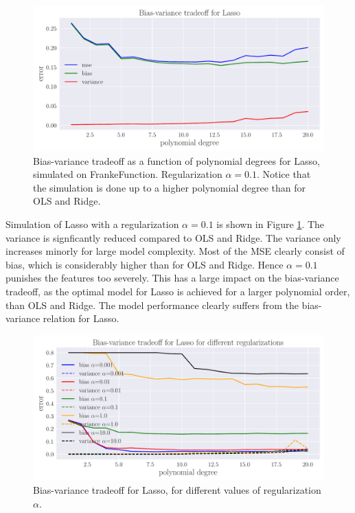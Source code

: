 \documentclass[a4paper]{article}
\begin{document}
	\begin{figure}[h]
		\centering
		\includegraphics[scale=0.5]{../output_extra/plots/bias_var_Lasso_c20.pdf}
		\caption{Bias-variance tradeoff as a function of polynomial degrees for Lasso, simulated on FrankeFunction. Regularization $\alpha=0.1$. Notice that the simulation is done up to a higher polynomial degree than for OLS and Ridge.}
		\label{fig:Lasso}
	\end{figure}
	
	Simulation of Lasso with a regularization $\alpha=0.1$ is shown in Figure \ref{fig:Lasso}. The variance is signficantly reduced compared to OLS and Ridge. The variance only increases minorly for large model complexity. Most of the MSE clearly consist of bias, which is considerably higher than for OLS and Ridge. Hence $\alpha=0.1$ punishes the features too severely. This has a large impact on the bias-variance tradeoff, as the optimal model for Lasso is achieved for a larger polynomial order, than OLS and Ridge. The model performance clearly suffers from the bias-variance relation for Lasso. 
	
	\begin{figure}[h]
		\centering
		\includegraphics[scale=0.5]{../output_extra/plots/bias_var_Lasso_c20_alpha.pdf}
		\caption{Bias-variance tradeoff for Lasso, for different values of regularization $\alpha$.}
		\label{fig:Lasso_alpha}
	\end{figure}
	
\end{document}
